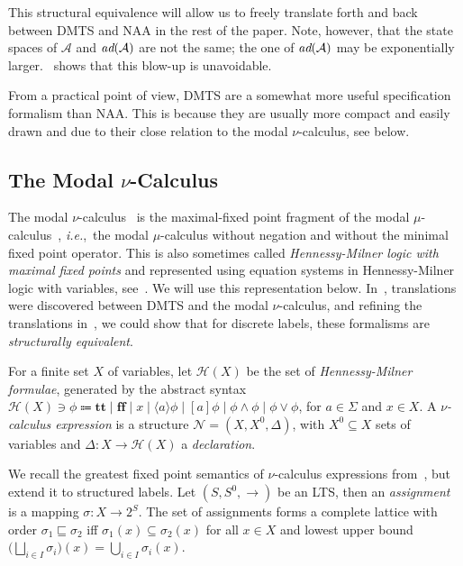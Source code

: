 \documentclass[twocolumn]{svjour3-dummy}
\newcommand*\ie{\textit{i.e.},}
\newcommand*{\must}[1]{\overset{#1}{\longrightarrow}}
\newcommand*{\omust}{\mathord{\must{}}}
\newcommand*\NAA{NAA\xspace}
\newcommand*\cA{\mathcal A}
\newcommand*\HML{\mathcal{H}}
\newcommand*\ttt{\mathbf{t\!t}}
\newcommand*\fff{\mathbf{ff}}
\newcommand*\cN{\mathcal N}
\begin{document}
This structural equivalence will allow us to freely translate forth and
back between DMTS and \NAA in the rest of the paper.  Note, however, that
the state spaces of $\cA$ and $\bd( \cA)$ are not the same; the one of
$\bd( \cA)$ may be exponentially larger.
\cite{DBLP:conf/ictac/FahrenbergLT14}~shows that this blow-up is
unavoidable.

From a practical point of view, DMTS are a somewhat more useful
specification formalism than \NAA.  This is because they are usually more
compact and easily drawn and due to their close relation to the modal
$\nu$-calculus, see below.

\subsection{The Modal $\nu$-Calculus}

The modal $\nu$-calculus~\cite{DBLP:journals/deds/FeuilladeP07} is the
maximal-fixed point fragment of the modal
$\mu$-calculus~\cite{DBLP:journals/tcs/Kozen83}, \ie~the modal
$\mu$-calculus without negation and without the minimal fixed point
operator.  This is also sometimes called \emph{Henn\-essy-Milner logic
  with maximal fixed points} and represented using equation systems in
Hennessy-Milner logic with variables,
see~\cite{DBLP:journals/tcs/Larsen90, books/AcetoILS07}.  We will use
this representation below.  In~\cite{DBLP:conf/concur/BenesDFKL13},
translations were discovered between DMTS and the modal
$\nu$-calculus, and refining the translations
in~\cite{DBLP:conf/ictac/FahrenbergLT14}, we could show that for
discrete labels, these formalisms are \emph{structurally equivalent}.

For a finite set $X$ of variables, let $\HML( X)$ be the set of
\emph{Hennessy-Milner formulae}, generated by the abstract syntax $\HML(
X)\ni \phi\Coloneqq \ttt\mid \fff\mid x\mid \langle a\rangle \phi\mid[
a] \phi\mid \phi\land \phi\mid \phi\lor \phi$, for $a\in \Sigma$ and
$x\in X$.  A \emph{$\nu$-calculus expression} is a structure $\cN=( X,
X^0, \Delta)$, with $X^0\subseteq X$ sets of variables and $\Delta: X\to
\HML( X)$ a \emph{declaration}.

We recall the greatest fixed point semantics of $\nu$-calculus
expressions from~\cite{DBLP:journals/tcs/Larsen90}, but extend it to
structured labels.  Let $( S, S^0, \omust)$ be an LTS, then an
\emph{assignment} is a mapping $\sigma: X\to 2^S$.  The set of
assignments forms a complete lattice with order $\sigma_1\sqsubseteq
\sigma_2$ iff $\sigma_1( x)\subseteq \sigma_2( x)$ for all $x\in X$ and
lowest upper bound $\big(\bigsqcup_{ i\in I} \sigma_i\big)( x)=
\bigcup_{ i\in I} \sigma_i( x)$.
\end{document}
